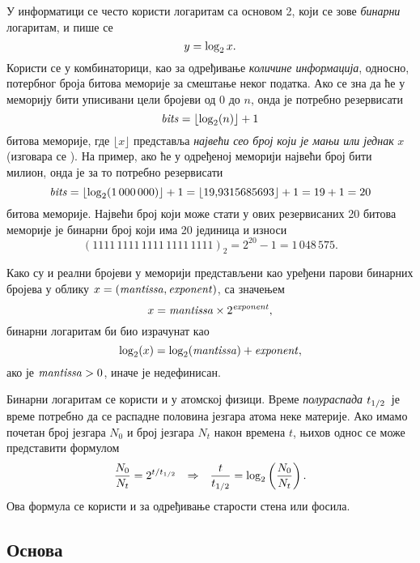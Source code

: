 \def\lb{\mathop{\rm lb}}
\def\bits{{\it bits}}
\def\mant{\textit{mantissa\/}}%
\def\expo{\textit{exponent\/}}%
\def\znak{{\it знак}}%

У информатици се често користи логаритам са основом 2, који се зове
{\sl бинарни\/} логаритам, и пише се
$$
y=\log_2 x.
$$
Користи се у комбинаторици, као за одређивање {\sl количине информација},
односно, потербног броја битова меморије за смештање неког податка.
Ако се зна да ће у меморију бити уписивани цели бројеви од
0 до $n$, онда је потребно резервисати
\begin{equation}\label{eq:bits}
  \bits = \lfloor\logtwo(n)\rfloor+1
\end{equation}
битова меморије, где $\lfloor x\rfloor$ 
представља {\sl највећи сео број који је мањи или једнак} $x$
(изговара се ).
На пример, ако ће у одређеној меморији највећи  
број бити милион, онда је за то потребно резервисати
$$
\bits=\lfloor\logtwo(1\,000\,000)\rfloor+1=\lfloor 19\.9315685693\rfloor+1 = 19+1=20
$$
битова меморије.
Највећи број који може стати у ових резервисаних 20 битова меморије је бинарни број који има 20 јединица 
и износи 
$$
(1111\,1111\,1111\,1111\,1111)_2=
2^{20}-1=1\,048\,575.
$$

Како су и реални бројеви у меморији представљени као уређени парови бинарних бројева у облику
$x=(\mant,\expo)$, са значењем
$$
x=\mant\puta2^\expo,
$$
бинарни логаритам би био израчунат као
$$
\logtwo(x)=\logtwo(\mant)+\expo,
$$
ако је $\mant>0$, иначе је недефинисан.

\smallskip

Бинарни логаритам се користи и у атомској физици.
Време {\sl полураспада\/} $t_{1/2}$\
је време потребно да се распадне половина језгара атома неке материје.
Ако имамо почетан број језгара
$N_0$ и број језгара $N_t$ након времена $t$, њихов однос
се може представити формулом
\begin{equation}
\label{eq:halftime}
\frac{N_0}{N_t}=2^{t/t_{1/2}}{\quad\Rightarrow\quad} \frac{t}{t_{1/2}}=\log_2\left( \frac{N_0}{N_t} \right).
\end{equation}
Ова формула се користи и за одређивање старости стена или фосила.



\subsection{Основа \e}

